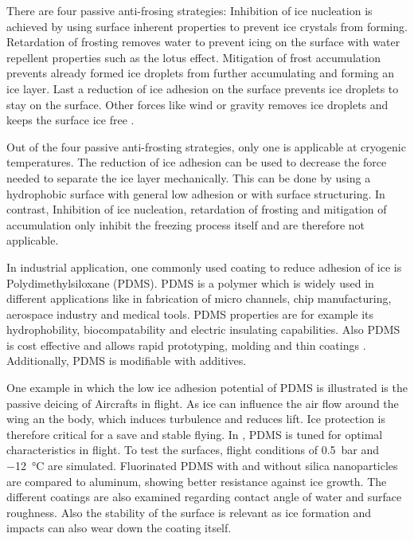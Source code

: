 There are four passive anti-frosing strategies: Inhibition of ice nucleation is achieved by using surface inherent properties to prevent ice crystals from forming. Retardation of frosting removes water to prevent icing on the surface with water repellent properties such as the lotus effect. Mitigation of frost accumulation prevents already formed ice droplets from further accumulating and forming an ice layer. Last a reduction of ice adhesion on the surface prevents ice droplets to stay on the surface. Other forces like wind or gravity removes ice droplets and keeps the surface ice free \cite{Yang.2021}. 

Out of the four passive anti-frosting strategies, only one is applicable at cryogenic temperatures. The reduction of ice adhesion can be used to decrease the force needed to separate the ice layer mechanically. This can be done by using a hydrophobic surface with general low adhesion or with surface structuring. In contrast, Inhibition of ice nucleation, retardation of frosting and mitigation of accumulation only inhibit the freezing process itself and are therefore not applicable.

In industrial application, one commonly used coating to reduce adhesion of ice is Polydimethylsiloxane (PDMS). PDMS is a polymer which is widely used in different applications like in fabrication of micro channels, chip manufacturing, aerospace industry and medical tools. PDMS properties are for example its hydrophobility, biocompatability and electric insulating capabilities. Also PDMS is cost effective and allows rapid prototyping, molding and thin coatings \cite{Wolf.2018}. Additionally, PDMS is modifiable with additives.

One example in which the low ice adhesion potential of PDMS is illustrated is the passive deicing of Aircrafts in flight. As ice can influence the air flow around the wing an the body, which induces turbulence and reduces lift. Ice protection is therefore critical for a save and stable flying. In \cite{Liu.2018}, PDMS is tuned for optimal characteristics in flight. To test the surfaces, flight conditions of \SI{0.5}{\bar} and \SI{-12}{\degreeCelsius} are simulated. Fluorinated PDMS with and without silica nanoparticles are compared to aluminum, showing better resistance against ice growth. The different coatings are also examined regarding contact angle of water and surface roughness. Also the stability of the surface is relevant as ice formation and impacts can also wear down the coating itself. 

